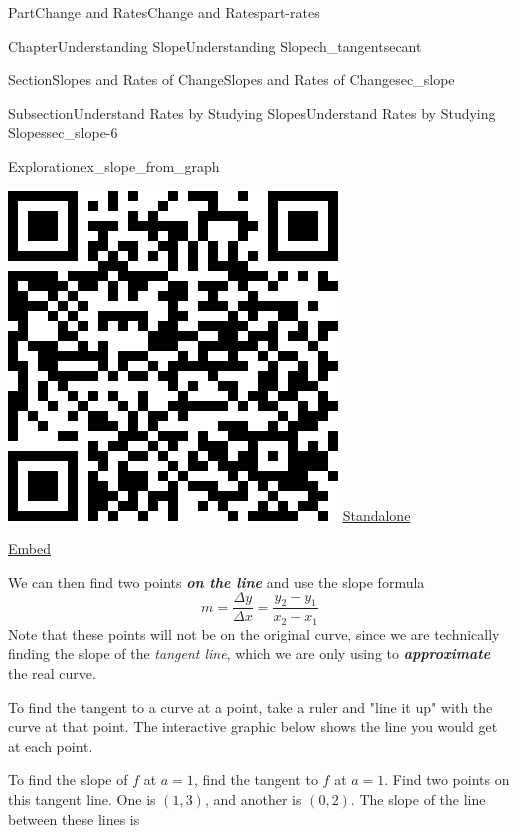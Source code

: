 \documentclass[oneside,10pt,]{tufte-book}
\newcommand{\alert}[1]{\textbf{\textit{#1}}}
\numberwithin{equation}{chapter}
\begin{document}
\begin{partptx}{Part}{Change and Rates}{}{Change and Rates}{}{}{part-rates}
\begin{chapterptx}{Chapter}{Understanding Slope}{}{Understanding Slope}{}{}{ch_tangentsecant}
\begin{sectionptx}{Section}{Slopes and Rates of Change}{}{Slopes and Rates of Change}{}{}{sec_slope}
\begin{subsectionptx}{Subsection}{Understand Rates by Studying Slopes}{}{Understand Rates by Studying Slopes}{}{}{sec_slope-6}
\begin{exploration}{Exploration}{}{ex_slope_from_graph}
\begin{enumerate}[font=\bfseries,label=(\alph*),ref=\alph*]
\begin{sidebyside}{2}{0.075}{0.075}{0.17}
\begin{sbspanel}{0.21}
\includegraphics[width=\linewidth]{generated/qrcode/ex_slope_from_graph-2-2-2.png}
\href{http://webwork.bridgew.edu/oer/functions_at_work/ex_slope_from_graph-2-2-2.html}{Standalone}%
\par
\href{http://webwork.bridgew.edu/oer/functions_at_work/ex_slope_from_graph-2-2-2-if.html}{Embed}%
\end{sbspanel}%
\end{sidebyside}%
\par
We can then find two points \alert{on the line} and use the slope formula%
\begin{equation*}
m = \dfrac{\Delta y}{\Delta x} = \dfrac{y_2-y_1}{x_2-x_1}
\end{equation*}
Note that these points will not be on the original curve, since we are technically finding the slope of the \emph{tangent line}, which we are only using to \alert{approximate} the real curve.%
\par
To find the tangent to a curve at a point, take a ruler and "line it up" with the curve at that point. The interactive graphic below shows the line you would get at each point.%
\par
To find the slope of \(f\) at \(a=1\), find the tangent to \(f\) at \(a=1\). Find two points on this tangent line.  One is \((1,3)\), and another is \((0,2)\). The slope of the line between these lines is%

\end{enumerate}
\end{exploration}
\end{subsectionptx}
\end{sectionptx}
\end{chapterptx}
\end{partptx}
\end{document}
